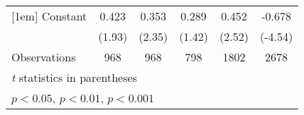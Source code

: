 {\begin{tabular}{l*{5}{c}}
[1em]
Constant        &    0.423         &    0.353\sym{*}  &    0.289         &    0.452\sym{*}  &   -0.678\sym{***}\\
                &   (1.93)         &   (2.35)         &   (1.42)         &   (2.52)         &  (-4.54)         \\
\hline
Observations    &      968         &      968         &      798         &     1802         &     2678         \\
\hline\hline
\multicolumn{6}{l}{\footnotesize \textit{t} statistics in parentheses}\\
\multicolumn{6}{l}{\footnotesize \sym{*} \(p<0.05\), \sym{**} \(p<0.01\), \sym{***} \(p<0.001\)}\\
\end{tabular}
}
